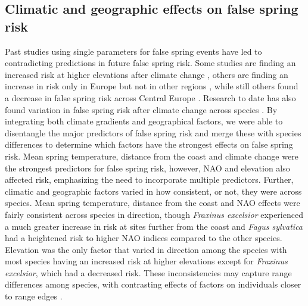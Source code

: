 \documentclass{article}\usepackage[]{graphicx}\usepackage[]{color}
\begin{document}
\subsection*{Climatic and geographic effects on false spring risk}
Past studies using single parameters for false spring events \citep{Liu2018,  Vitasse2018, Ma2018, Wypych2016a} have led to contradicting predictions in future false spring risk. Some studies are finding an increased risk at higher elevations after climate change \citep{Vitasse2018}, others are finding an increase in risk only in Europe but not in other regions \citep{Liu2018}, while still others found a decrease in false spring risk across Central Europe \citep{Wypych2016a}. Research to date has also found variation in false spring risk after climate change across species \citep{Ma2018}. By integrating both climate gradients and geographical factors, we were able to disentangle the major predictors of false spring risk and merge these with species differences to determine which factors have the strongest effects on false spring risk. Mean spring temperature, distance from the coast and climate change were the strongest predictors for false spring risk, however, NAO and elevation also affected risk, emphasizing the need to incorporate multiple predictors. Further, climatic and geographic factors varied in how consistent, or not, they were across species. Mean spring temperature, distance from the coast and NAO effects were fairly consistent across species in direction, though \textit{Fraxinus excelsior} experienced a much greater increase in risk at sites further from the coast and \textit{Fagus sylvatica} had a heightened risk to higher NAO indices compared to the other species. Elevation was the only factor that varied in direction among the species with most species having an increased risk at higher elevations except for \textit{Fraxinus excelsior}, which had a decreased risk. These inconsistencies may capture range differences among species, with contrasting effects of factors on individuals closer to range edges \citep{Chuine2008}. %
\end{document}
